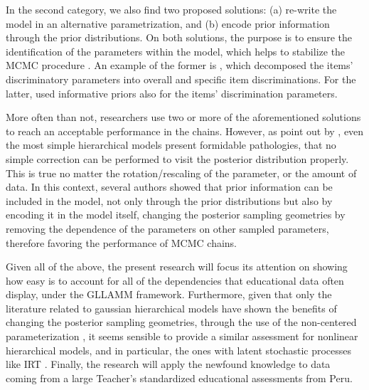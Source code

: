 In the second category, we also find two proposed solutions: (a) re-write the model in an alternative parametrization, and (b) encode prior information through the prior distributions. On both solutions, the purpose is to ensure the identification of the parameters within the model, which helps to stabilize the MCMC procedure \cite{Gelman_et_al_2014}. An example of the former is \citet{Fujimoto_2018a}, which decomposed the items' discriminatory parameters into overall and specific item discriminations. For the latter, \citet{Fujimoto_2020} used informative priors also for the items' discrimination parameters.

More often than not, researchers use two or more of the aforementioned solutions to reach an acceptable performance in the chains. However, as point out by \citet{Betancourt_et_al_2013}, even the most simple hierarchical models present formidable pathologies, that no simple correction can be performed to visit the posterior distribution properly. This is true no matter the rotation/rescaling of the parameter, or the amount of data. In this context, several authors \cite{Gelfand_et_al_1995, Gelfand_et_al_1996, Papaspiliopoulos_et_al_2003, Papaspiliopoulos_et_al_2007, Betancourt_et_al_2013} showed that prior information can be included in the model, not only through the prior distributions but also by encoding it in the model itself, changing the posterior sampling geometries by removing the dependence of the parameters on other sampled parameters, therefore favoring the performance of MCMC chains.

Given all of the above, the present research will focus its attention on showing how easy is to account for all of the dependencies that educational data often display, under the GLLAMM framework. Furthermore,  given that only the literature related to gaussian hierarchical models have shown the benefits of changing the posterior sampling geometries, through the use of the non-centered parameterization \cite{Gelfand_et_al_1995, Gelfand_et_al_1996, Papaspiliopoulos_et_al_2003, Papaspiliopoulos_et_al_2007, Betancourt_et_al_2013}, it seems sensible to provide a similar assessment for nonlinear hierarchical models, and in particular, the ones with latent stochastic processes like IRT \cite{Papaspiliopoulos_et_al_2007}. Finally, the research will apply the newfound knowledge to data coming from a large Teacher's standardized educational assessments from Peru.


